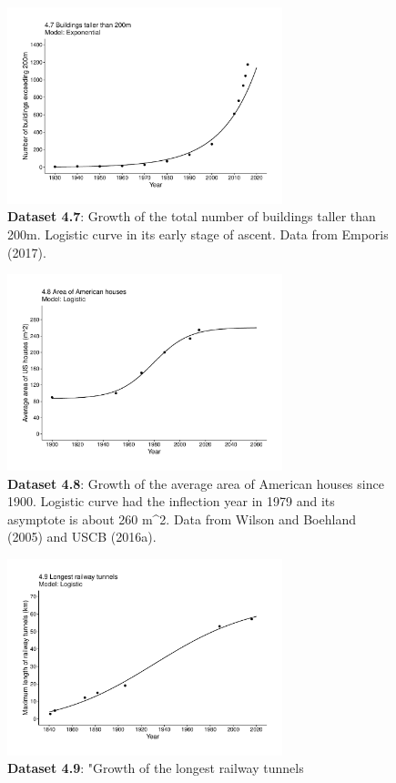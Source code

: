\documentclass[aps,rmp,preprint,superscriptaddress,10pt,onecolumn]{article}
\begin{document}
\begin{figure}[h]
\includegraphics[width=8cm]{output/figs-ggplot/4.7.pdf}
\caption{\textbf{Dataset 4.7}: Growth of the total number of buildings taller than 200m. Logistic curve in its early stage of ascent. Data from Emporis (2017).}
\end{figure}
	
\begin{figure}[h]
\includegraphics[width=8cm]{output/figs-ggplot/4.8.pdf}
\caption{\textbf{Dataset 4.8}: Growth of the average area of American houses since 1900. Logistic curve had the inflection year in 1979 and its asymptote is about 260 m^2. Data from Wilson and Boehland (2005) and USCB (2016a).}
\end{figure}
	
\begin{figure}[h]
\includegraphics[width=8cm]{output/figs-ggplot/4.9.pdf}
\caption{\textbf{Dataset 4.9}: "Growth of the longest railway tunnels}
\end{figure}
	
\end{document}
